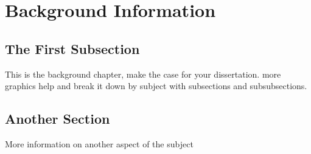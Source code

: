 %
%
%



\pagestyle{plain}
\chapter{Background Information} %
\renewcommand{\thetable}{\arabic{chapter}.\arabic{table}}  
\renewcommand{\thefigure}{\arabic{chapter}.\arabic{figure}} 

\section{The First Subsection}
This is the background chapter, make the case for your dissertation. more graphics help and break it down by subject with subsections and subsubsections.

\section{Another Section}
More information on another aspect of the subject